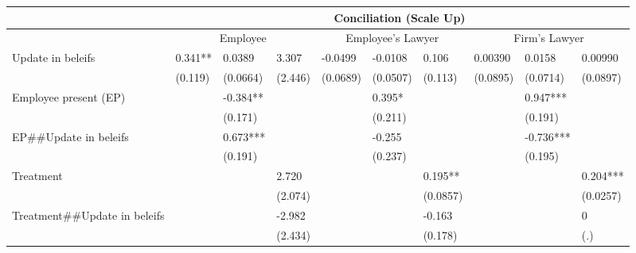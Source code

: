 \begin{tabular}{lccccccccc}
      & \multicolumn{9}{c}{Conciliation (Scale Up)} \\
\midrule
      & \multicolumn{3}{c}{Employee} & \multicolumn{3}{c}{Employee's Lawyer} & \multicolumn{3}{c}{Firm's Lawyer} \\
\midrule
\midrule
Update in beleifs & \multicolumn{1}{l}{0.341**} & \multicolumn{1}{l}{0.0389} & \multicolumn{1}{l}{3.307} & \multicolumn{1}{l}{-0.0499} & \multicolumn{1}{l}{-0.0108} & \multicolumn{1}{l}{0.106} & \multicolumn{1}{l}{0.00390} & \multicolumn{1}{l}{0.0158} & \multicolumn{1}{l}{0.00990} \\
      & \multicolumn{1}{l}{(0.119)} & \multicolumn{1}{l}{(0.0664)} & \multicolumn{1}{l}{(2.446)} & \multicolumn{1}{l}{(0.0689)} & \multicolumn{1}{l}{(0.0507)} & \multicolumn{1}{l}{(0.113)} & \multicolumn{1}{l}{(0.0895)} & \multicolumn{1}{l}{(0.0714)} & \multicolumn{1}{l}{(0.0897)} \\
Employee present (EP) &       & \multicolumn{1}{l}{-0.384**} &       &       & \multicolumn{1}{l}{0.395*} &       &       & \multicolumn{1}{l}{0.947***} &  \\
      &       & \multicolumn{1}{l}{(0.171)} &       &       & \multicolumn{1}{l}{(0.211)} &       &       & \multicolumn{1}{l}{(0.191)} &  \\
EP\#\#Update in beleifs &       & \multicolumn{1}{l}{0.673***} &       &       & \multicolumn{1}{l}{-0.255} &       &       & \multicolumn{1}{l}{-0.736***} &  \\
      &       & \multicolumn{1}{l}{(0.191)} &       &       & \multicolumn{1}{l}{(0.237)} &       &       & \multicolumn{1}{l}{(0.195)} &  \\
Treatment &       &       & \multicolumn{1}{l}{2.720} & \multicolumn{1}{l}{} & \multicolumn{1}{l}{} & \multicolumn{1}{l}{0.195**} & \multicolumn{1}{l}{} & \multicolumn{1}{l}{} & \multicolumn{1}{l}{0.204***} \\
      &       &       & \multicolumn{1}{l}{(2.074)} & \multicolumn{1}{l}{} & \multicolumn{1}{l}{} & \multicolumn{1}{l}{(0.0857)} & \multicolumn{1}{l}{} & \multicolumn{1}{l}{} & \multicolumn{1}{l}{(0.0257)} \\
Treatment\#\#Update in beleifs &       &       & \multicolumn{1}{l}{-2.982} &       &       & \multicolumn{1}{l}{-0.163} &       &       & \multicolumn{1}{l}{0} \\
      &       &       & \multicolumn{1}{l}{(2.434)} &       &       & \multicolumn{1}{l}{(0.178)} &       &       & \multicolumn{1}{l}{(.)} \\

\end{tabular}
